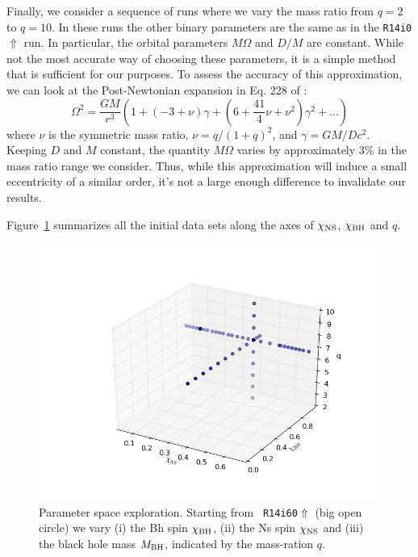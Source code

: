 Finally, we consider a sequence of runs where we vary the mass ratio
from $q=2$ to $q=10$. In these runs the other binary parameters are
the same as in the {\tt R14i0$\Uparrow$} run. In particular, the
orbital parameters $M\Omega$ and $D/M$ are constant. While not the
most accurate way of choosing these parameters, it is a simple method
that is sufficient for our purposes. To assess the accuracy of this
approximation, we can look at the Post-Newtonian expansion in Eq. 228 of \cite{Blanchet2006}:
\begin{equation}
\Omega^2=\frac{GM}{r^3}\left(1+(-3+\nu)\gamma+\left(6+\frac{41}{4}\nu+\nu^2\right)\gamma^2+...\right)
\end{equation}
where $\nu$ is the symmetric mass ratio, $\nu=q/(1+q)^2$, and $\gamma=GM/Dc^2$. Keeping $D$ and $M$ constant, the quantity $M\Omega$ varies by approximately 3\% in the mass ratio range we consider.
Thus, while this approximation will induce a small eccentricity of a similar order, it's not a large enough difference to invalidate our results.

Figure~\ref{fig:3dparam} summarizes all the initial data sets along the axes of $\chi_{\rm NS}$, $\chi_{\rm BH}$ and $q$.

\begin{figure}
\includegraphics[width=0.95\columnwidth]{chap4/3dparam.png}
\caption[3d parameter space plot of Bh-Ns initial data sets.]{\label{fig:3dparam}
Parameter space exploration. Starting from {\tt
  R14i60$\Uparrow$} (big open circle) we vary (i) the Bh spin
$\chi_{\rm BH}$, (ii) the Ns spin $\chi_{\rm NS}$ and (iii) the black
hole mass $M_{\rm BH}$, indicated by the mass-ration $q$.}
\end{figure}


